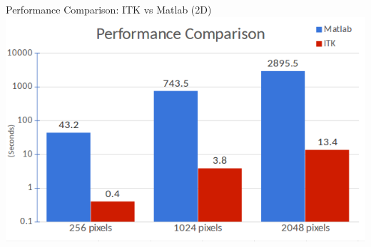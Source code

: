 \documentclass[10pt]{beamer}
\begin{document}
{
\begin{frame}[fragile]{Performance Comparison: ITK vs Matlab (2D)}
  \centering
  \includegraphics[height=0.9\textheight]{./figures/TextureFeaturesPerformanceComparison.png}
\end{frame}

}
\end{document}
